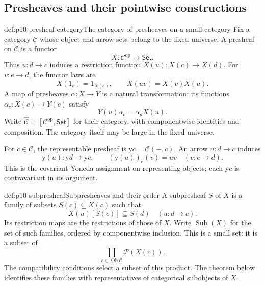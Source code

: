 
\subsection{Presheaves and their pointwise constructions}
\label{sec:p10-presheaf-categories}

\begin{hbdefinition}{def:p10-presheaf-category}{The category of presheaves on a small category}
Fix a category \(\mathcal C\) whose object and arrow sets belong
to the fixed universe.  A presheaf on \(\mathcal C\) is a functor
\[
                         X:\mathcal C^{\mathrm{op}}\to\mathsf{Set}.
\]
Thus \(u:d\to c\) induces a restriction function
\(X(u):X(c)\to X(d)\).
For \(v:e\to d\), the functor laws are
\[
                    X(1_c)=1_{X(c)},\qquad
                    X(u v)=X(v)X(u).
\]
A map of presheaves \(\alpha:X\to Y\) is a natural
transformation: its functions \(\alpha_c:X(c)\to Y(c)\) satisfy
\[
                         Y(u)\alpha_c=\alpha_d X(u).
\]
Write
\(\widehat{\mathcal C}=[\mathcal C^{\mathrm{op}},\mathsf{Set}]\)
for their category, with componentwise identities and composition.
The category itself may be large in the fixed universe.

For \(c\in\mathcal C\), the representable presheaf is
\(\mathrm y c=\mathcal C(-,c)\).
An arrow \(u:d\to c\) induces
\[
 \mathrm y(u):\mathrm y d\longrightarrow\mathrm y c,\qquad
 (\mathrm y(u))_e(v)=u v\quad(v:e\to d).
\]
This is the covariant Yoneda assignment on representing objects;
each \(\mathrm y c\) is contravariant in its argument.
\end{hbdefinition}

\begin{hbdefinition}{def:p10-subpresheaf}{Subpresheaves and their order}
A subpresheaf \(S\) of \(X\) is a family of subsets
\(S(c)\subseteq X(c)\) such that
\[
                         X(u)[S(c)]\subseteq S(d)
                         \quad(u:d\to c).
\]
Its restriction maps are the restrictions of those of \(X\).
Write \(\operatorname{Sub}(X)\) for the set of such families,
ordered by componentwise inclusion.
This is a small set: it is a subset of
\[
                       \prod_{c\in\operatorname{Ob}\mathcal C}
                                      \mathcal P(X(c)).
\]
The compatibility conditions select a subset of this product.
The theorem below identifies these families with representatives
of categorical subobjects of \(X\).
\end{hbdefinition}

